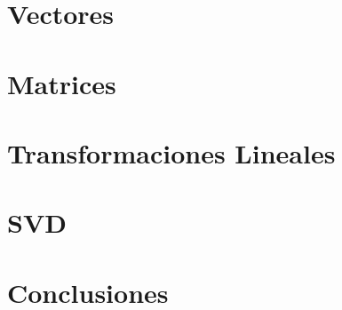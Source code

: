 \documentclass[11pt,letterpaper]{article}
\title{}
\author{}
\begin{document}


\section{Vectores}

\newpage

\section{Matrices}

\newpage

\section{Transformaciones Lineales}

\newpage

\section{SVD}

\newpage

\section{Conclusiones}

\newpage
\end{document}
